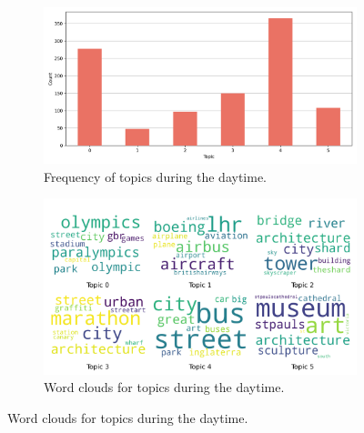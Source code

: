 \documentclass{article}
\theoremstyle{definition}
\theoremstyle{remark}
\begin{document}
\begin{figure}[!h]
    \centering
    \begin{subfigure}{0.45\textwidth}
        \centering
        \includegraphics[width=\linewidth]{figures/places_sense_daytime_tourists.png} 
        \caption{Frequency of topics during the daytime.}
        \label{fig:places_sense_daytime_tourists}
    \end{subfigure}
    \hfill
    \begin{subfigure}{0.5\textwidth}
        \centering
        \includegraphics[width=\linewidth]{figures/topics_daytime_tourists.png} 
        \caption{Word clouds for topics during the daytime.}
        \label{fig:topics_daytime_tourists}
    \end{subfigure}


\end{figure}
\end{document}
